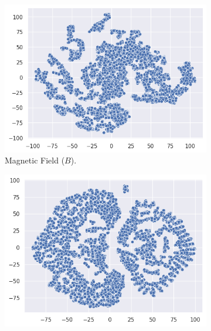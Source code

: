 \begin{figure}[h]
    \caption{t-SNE applied to the different variables. (a) and (b) represent the t-SNE of the magnetic field variable ($B[G]$) and the flux-tube inclination variable ($\alpha [deg]$), respectively; (c) is the t-SNE of all input variables combined.}
    \label{fig:tsne_2d}
    \begin{subfigure}[h]{0.329\textwidth}
        \centering
        \includegraphics[width=\textwidth]{figures/tsne_mag_2d.png}
        \caption{Magnetic Field ($B$).}
        \label{fig:tsne_mag_2d}
    \end{subfigure}
    \hfill
    \begin{subfigure}[h]{0.329\textwidth}
        \centering
        \includegraphics[width=\textwidth]{figures/tsne_alpha_2d.png}

\end{subfigure}
\end{figure}
